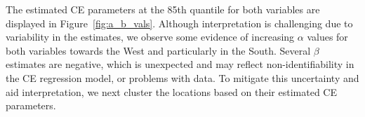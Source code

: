 \documentclass[12pt]{article}
\DeclareMathOperator{\CE}{\mathrm{CE}}
\begin{document}

The estimated CE parameters at the 85th quantile for both variables are displayed in Figure~\ref{fig:a_b_vals}.  
Although interpretation is challenging due to variability in the estimates, we observe some evidence of increasing $\alpha$ values for both variables towards the West and particularly in the South.  
Several $\beta$ estimates are negative, which is unexpected and may reflect non-identifiability in the CE regression model, or problems with data. 
To mitigate this uncertainty and aid interpretation, we next cluster the locations based on their estimated CE parameters.  
\end{document}
